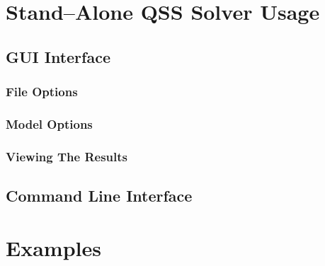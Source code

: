\documentclass[11pt,a4paper]{article}
\begin{document}
\section{Stand--Alone QSS Solver Usage}

\subsection{GUI Interface}

\subsubsection{File Options}

\subsubsection{Model Options}

\subsubsection{Viewing The Results}

\subsection{Command Line Interface}

\section{Examples}
\end{document}
